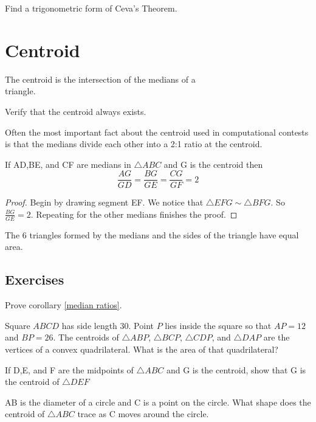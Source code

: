 \documentclass[11pt]{scrartcl}
\theoremstyle{plain}
\begin{document}
    \begin{exercise}
        Find a trigonometric form of Ceva's Theorem.
    \end{exercise}
    
\section{Centroid}
    
        \begin{definition}
            The centroid is the intersection of the medians of a \\triangle.
       \end{definition} 
    
       
    \begin{exercise}
        Verify that the centroid always exists.
    \end{exercise}
    Often the most important fact about the centroid used in computational
    contests is that the medians divide each other into a 2:1 ratio at the centroid.
    
        \begin{theorem}
            If AD,BE, and CF are medians in $\triangle ABC$ and G is the centroid then $$\frac{AG}{GD}=\frac{BG}{GE}=\frac{CG}{GF}=2$$
        \end{theorem}
    
    \begin{proof}
        Begin by drawing segment EF. We notice that $\triangle EFG \sim \triangle BFG$.
        So $\frac{BG}{GE} =2$. Repeating for the other medians finishes the proof.
    \end{proof}
    
        \begin{corollary}
        \label{median ratios}
            The 6 triangles formed by the medians and the sides of the triangle have equal area.
        \end{corollary}
    
    \subsection{Exercises}
    \begin{exercise}
        Prove corollary \ref{median ratios}.
    \end{exercise}
    \begin{exercise}[2018 AMC]
        Square $ABCD$ has side length $30$. Point $P$ lies inside the square so that $AP = 12$ and $BP = 26$. The centroids of $\triangle{ABP}$, $\triangle{BCP}$, $\triangle{CDP}$, and $\triangle{DAP}$ are the vertices of a convex quadrilateral. What is the area of that quadrilateral?
    \end{exercise}
    \begin{exercise} If D,E, and F are the midpoints of $\triangle ABC$ and G is the centroid, show that G is the centroid of $\triangle DEF$
    \end{exercise}
    \begin{exercise} AB is the diameter of a circle and C is a point on the circle. What shape does the centroid of $\triangle ABC$ trace as C moves around the circle.
    \end{exercise}
\end{document}
